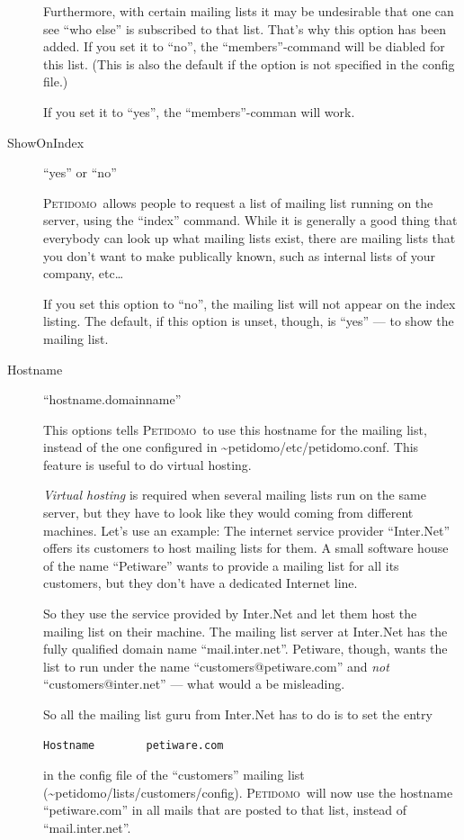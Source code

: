 \documentclass[a4paper,10pt]{scrreprt}
\newcommand{\Petidomo}{{\scshape Peti\-domo}}
\newcommand{\Def}[1]{{\sl #1}}
\newcommand{\file}[1]{{\sf #1}}
\begin{document}
\begin{description}
Furthermore, with certain mailing lists it may be undesirable that one
can see ``who else'' is subscribed to that list. That's why this
option has been added. If you set it to ``no'', the
``members''-command will be diabled for this list. (This is also the
default if the option is not specified in the config file.)

If you set it to ``yes'', the ``members''-comman will work.

\item[ShowOnIndex]  \hfill ``yes'' or ``no''

\Petidomo\ allows people to request a list of mailing list running on
the server, using the ``index'' command. While it is generally a good
thing that everybody can look up what mailing lists exist, there are
mailing lists that you don't want to make publically known, such as
internal lists of your company, etc\dots{}

If you set this option to ``no'', the mailing list will not appear on
the index listing. The default, if this option is unset, though, is
``yes'' --- to show the mailing list.


\item[Hostname] \hfill ``hostname.domainname''

This options tells \Petidomo\ to use this hostname for the mailing
list, instead of the one configured in
\file{\~{}petidomo/etc/petidomo.conf}. This feature is useful to do
virtual hosting.

\Def{Virtual hosting} is required when
several mailing lists run on the same server, but they have to look
like they would coming from different machines. Let's use an example:
The internet service provider ``Inter.Net'' offers its customers to
host mailing lists for them. A small software house of the name
``Petiware'' wants to provide a mailing list for all its customers,
but they don't have a dedicated Internet line.

So they use the service provided by Inter.Net and let them host the
mailing list on their machine. The mailing list server at Inter.Net
has the fully qualified domain name ``mail.inter.net''. Petiware,
though, wants the list to run under the name
``customers@petiware.com'' and \emph{not} ``customers@inter.net'' ---
what would a be misleading.

So all the mailing list guru from Inter.Net has to do is to set the
entry
\begin{verbatim}
Hostname        petiware.com
\end{verbatim}
in the config file of the ``customers'' mailing list
(\file{\~{}peti\-domo/lists/cu\-stomers/config}). \Petidomo\ will now use the
hostname ``peti\-ware.com'' in all mails that are posted to that list,
instead of ``mail.inter.net''.


\end{description}
\end{document}
